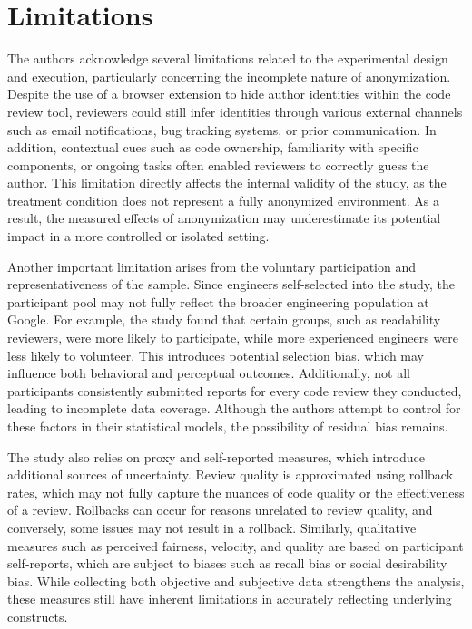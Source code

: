 \section{Limitations}
The authors acknowledge several limitations related to the experimental design and execution, particularly concerning the incomplete nature of anonymization. Despite the use of a browser extension to hide author identities within the code review tool, reviewers could still infer identities through various external channels such as email notifications, bug tracking systems, or prior communication. In addition, contextual cues such as code ownership, familiarity with specific components, or ongoing tasks often enabled reviewers to correctly guess the author. This limitation directly affects the internal validity of the study, as the treatment condition does not represent a fully anonymized environment. As a result, the measured effects of anonymization may underestimate its potential impact in a more controlled or isolated setting.

Another important limitation arises from the voluntary participation and representativeness of the sample. Since engineers self-selected into the study, the participant pool may not fully reflect the broader engineering population at Google. For example, the study found that certain groups, such as readability reviewers, were more likely to participate, while more experienced engineers were less likely to volunteer. This introduces potential selection bias, which may influence both behavioral and perceptual outcomes. Additionally, not all participants consistently submitted reports for every code review they conducted, leading to incomplete data coverage. Although the authors attempt to control for these factors in their statistical models, the possibility of residual bias remains.

The study also relies on proxy and self-reported measures, which introduce additional sources of uncertainty. Review quality is approximated using rollback rates, which may not fully capture the nuances of code quality or the effectiveness of a review. Rollbacks can occur for reasons unrelated to review quality, and conversely, some issues may not result in a rollback. Similarly, qualitative measures such as perceived fairness, velocity, and quality are based on participant self-reports, which are subject to biases such as recall bias or social desirability bias. While collecting both objective and subjective data strengthens the analysis, these measures still have inherent limitations in accurately reflecting underlying constructs.

